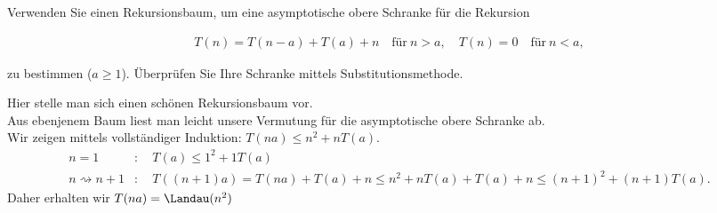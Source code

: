 
\begin{exercise}

Verwenden Sie einen Rekursionsbaum, um eine asymptotische obere Schranke für die Rekursion

\begin{align*}
  T(n) = T(n-a) + T(a) + n \quad \text{für}~ n > a,\quad T(n) = 0 \quad \text{für}~ n < a,
\end{align*}

zu bestimmen ($a \geq 1$). Überprüfen Sie Ihre Schranke mittels Substitutionsmethode.
\end{exercise}


\begin{solution}

Hier stelle man sich einen schönen Rekursionsbaum vor. \\
Aus ebenjenem Baum liest man leicht unsere Vermutung für die asymptotische obere Schranke ab. \\
Wir zeigen mittels vollständiger Induktion: $T(na) \leq n^2 + nT(a)$.
\begin{align*}
  n = 1&: \quad T(a) \leq 1^2 + 1T(a) \\
  n \rightsquigarrow n+1&: \quad T((n+1)a) = T(na) + T(a) + n \leq n^2 + nT(a) + T(a) + n
  \leq (n+1)^2 + (n+1)T(a).
\end{align*}
Daher erhalten wir $T(na) = \Landau(n^2)$
\end{solution}


